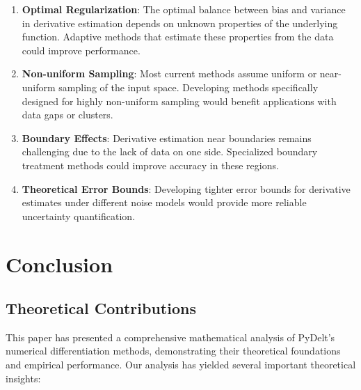 \documentclass[10pt,journal,compsoc]{IEEEtran}
\begin{document}
\begin{enumerate}
    \item \textbf{Optimal Regularization}: The optimal balance between bias and variance in derivative estimation depends on unknown properties of the underlying function. Adaptive methods that estimate these properties from the data could improve performance.
    
    \item \textbf{Non-uniform Sampling}: Most current methods assume uniform or near-uniform sampling of the input space. Developing methods specifically designed for highly non-uniform sampling would benefit applications with data gaps or clusters.
    
    \item \textbf{Boundary Effects}: Derivative estimation near boundaries remains challenging due to the lack of data on one side. Specialized boundary treatment methods could improve accuracy in these regions.
    
    \item \textbf{Theoretical Error Bounds}: Developing tighter error bounds for derivative estimates under different noise models would provide more reliable uncertainty quantification.
\end{enumerate}

\section{Conclusion}

\subsection{Theoretical Contributions}

This paper has presented a comprehensive mathematical analysis of PyDelt's numerical differentiation methods, demonstrating their theoretical foundations and empirical performance. Our analysis has yielded several important theoretical insights:
\end{document}
